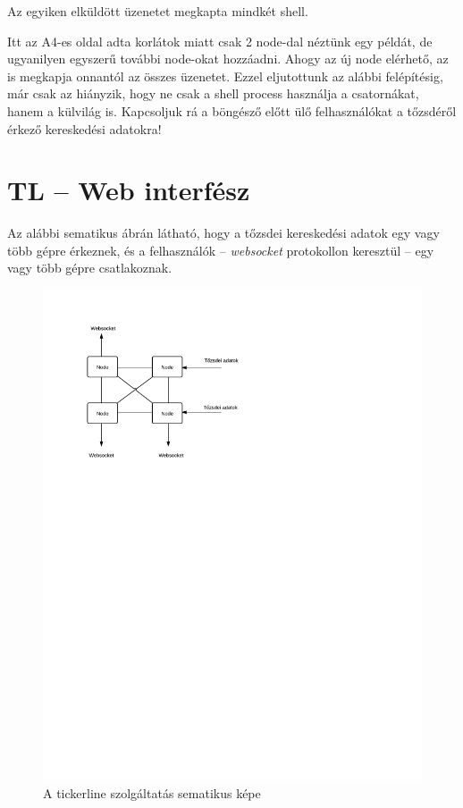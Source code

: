 \documentclass[12pt, a4paper, oneside]{book}
\begin{document}
Az egyiken elküldött üzenetet megkapta mindkét shell.

Itt az A4-es oldal adta korlátok miatt csak 2 node-dal néztünk egy példát, de
ugyanilyen egyszerű további node-okat hozzáadni. Ahogy az új node elérhető, az
is megkapja onnantól az összes üzenetet. Ezzel eljutottunk az alábbi
felépítésig, már csak az hiányzik, hogy ne csak a shell process használja a
csatornákat, hanem a külvilág is. Kapcsoljuk rá a böngésző előtt ülő
felhasználókat a tőzsdéről érkező kereskedési adatokra!

\section{TL -- Web interfész}
Az alábbi sematikus ábrán látható, hogy a tőzsdei kereskedési adatok egy vagy
több gépre érkeznek, és a felhasználók -- \emph{websocket} protokollon
keresztül -- egy vagy több gépre csatlakoznak.

\begin{figure}
\caption{A tickerline szolgáltatás sematikus képe}
\includegraphics[clip=true, trim= 0 18cm 0 1cm]{fig/NodesWeb.pdf}
\end{figure}
\end{document}
